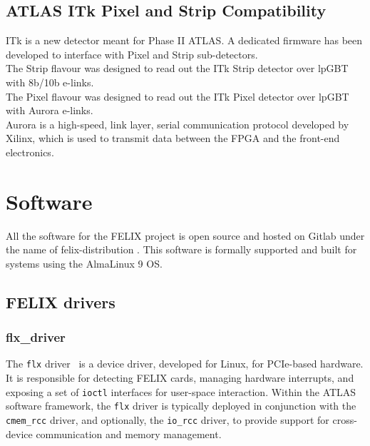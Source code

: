 \subsection{\acs{ATLAS} \acs{ITk} Pixel and Strip Compatibility}
\label{subsec:felix-itk}

\acf{ITk} \cite{atlas-itk-pixel-detector} is a new detector meant for Phase II \acs{ATLAS}.
A dedicated firmware has been developed to interface with  Pixel and Strip sub-detectors.\\

The Strip flavour was designed to read out the \acs{ITk} Strip detector over \acs{lpGBT} with 8b/10b e-links.\\
The Pixel flavour was designed to read out the \acs{ITk} Pixel detector over \acs{lpGBT} with Aurora \cite{aurora-protocol} e-links.\\

Aurora \cite{aurora-protocol} is a high-speed, link layer, serial communication protocol developed by Xilinx, which is used to transmit data between the \acs{FPGA} and the front-end electronics.

\clearpage
\section{Software}

All the software for the \acs{FELIX} project is open source and hosted on Gitlab under the name of felix-distribution \cite{felix-distribution}. This software is formally supported and built for systems using the AlmaLinux 9 \acl{OS}.

\subsection{\acs{FELIX} drivers}

\subsubsection{flx\_driver}

The \texttt{flx} driver~\cite{felix-driver} is a device driver, developed for Linux, for \acs{PCIe}-based hardware. It is responsible for detecting \acs{FELIX} cards, managing hardware interrupts, and exposing a set of \texttt{ioctl} interfaces for user-space interaction. Within the \acs{ATLAS} software framework, the \texttt{flx} driver is typically deployed in conjunction with the \texttt{cmem\_rcc} driver, and optionally, the \texttt{io\_rcc} driver, to provide support for cross-device communication and memory management.

